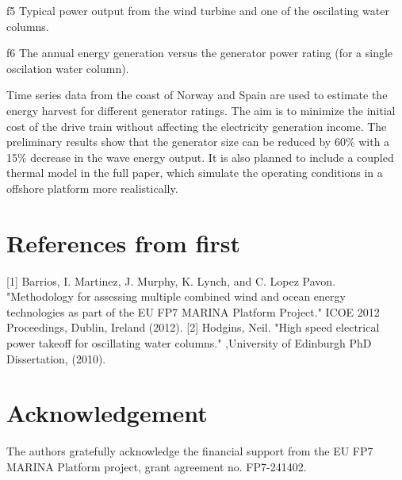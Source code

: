 \documentclass[twocolumn]{article}
\begin{document}
{f5} Typical power output from the wind turbine and one of the oscilating water columns.

{f6} The annual energy generation versus the generator power rating (for a single oscilation water column).

Time series data from the coast of Norway and Spain are used to estimate the energy harvest for different generator ratings. The aim is to minimize the initial cost of the drive train without affecting the electricity generation income. The preliminary results show that the generator size can be reduced by 60\% with a 15\% decrease in the wave energy output. It is also planned to include a coupled thermal model in the full paper, which simulate the operating conditions in a offshore platform more realistically.


\section{References from first} %
\label{sec:references_from_first}
[1] Barrios, I. Martinez, J. Murphy, K. Lynch, and C. Lopez Pavon. "Methodology for assessing multiple combined wind and ocean energy technologies as part of the EU FP7 MARINA Platform Project." ICOE 2012 Proceedings, Dublin, Ireland (2012).
[2] Hodgins, Neil. "High speed electrical power takeoff for oscillating water columns." ,University of Edinburgh PhD Dissertation, (2010).

\section*{Acknowledgement} %
\label{sec:acknowledgement}

The authors gratefully acknowledge the financial support
from the EU FP7 MARINA Platform project, grant agreement no. FP7-241402.






\end{document}
